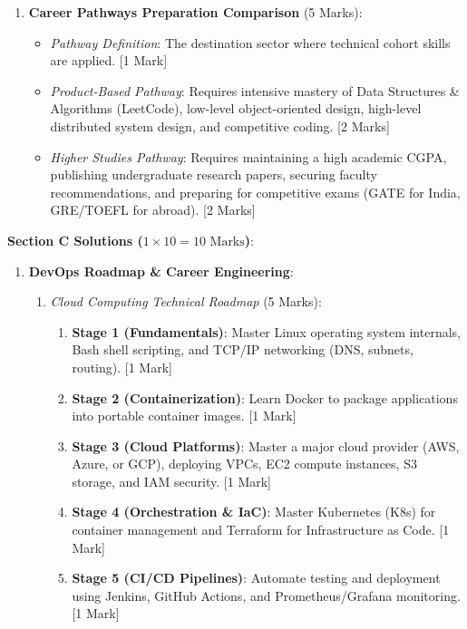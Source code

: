 \begin{solutionbox}
\begin{enumerate}[start=6]
    \item \textbf{Career Pathways Preparation Comparison} (5 Marks):
    \begin{itemize}
        \item \textit{Pathway Definition}: The destination sector where technical cohort skills are applied. [1 Mark]
        \item \textit{Product-Based Pathway}: Requires intensive mastery of Data Structures \& Algorithms (LeetCode), low-level object-oriented design, high-level distributed system design, and competitive coding. [2 Marks]
        \item \textit{Higher Studies Pathway}: Requires maintaining a high academic CGPA, publishing undergraduate research papers, securing faculty recommendations, and preparing for competitive exams (GATE for India, GRE/TOEFL for abroad). [2 Marks]
    \end{itemize}
\end{enumerate}

\medskip
\noindent\textbf{Section C Solutions ($1 \times 10 = 10\text{ Marks}$)}:
\begin{enumerate}[start=8]
    \item \textbf{DevOps Roadmap \& Career Engineering}:
    \begin{enumerate}[label=(\alph*)]
        \item \textit{Cloud Computing Technical Roadmap} (5 Marks):
        \begin{enumerate}
            \item \textbf{Stage 1 (Fundamentals)}: Master Linux operating system internals, Bash shell scripting, and TCP/IP networking (DNS, subnets, routing). [1 Mark]
            \item \textbf{Stage 2 (Containerization)}: Learn Docker to package applications into portable container images. [1 Mark]
            \item \textbf{Stage 3 (Cloud Platforms)}: Master a major cloud provider (AWS, Azure, or GCP), deploying VPCs, EC2 compute instances, S3 storage, and IAM security. [1 Mark]
            \item \textbf{Stage 4 (Orchestration \& IaC)}: Master Kubernetes (K8s) for container management and Terraform for Infrastructure as Code. [1 Mark]
            \item \textbf{Stage 5 (CI/CD Pipelines)}: Automate testing and deployment using Jenkins, GitHub Actions, and Prometheus/Grafana monitoring. [1 Mark]
        \end{enumerate}


\end{enumerate}
\end{enumerate}
\end{solutionbox}
